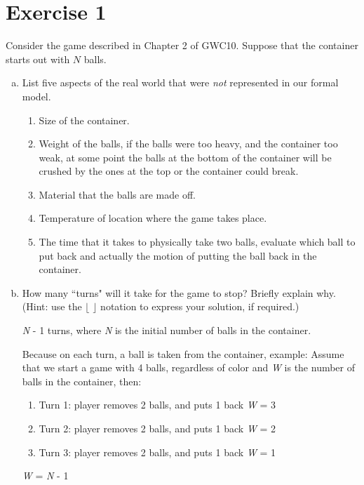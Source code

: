 \documentclass[11pt]{article}
\begin{document}
    \section{
    Exercise 1}
    Consider the game described in Chapter 2 of GWC10. Suppose that
    the container starts out with $N$ balls.
    \begin{enumerate}[(a)]
        \item List five aspects of the real world that were \emph{not}
        represented in our formal model.
        \begin{enumerate}
            \item Size of the container.
            \item Weight of the balls, if the balls were too heavy, and the container too weak, at some point the balls at the bottom of the container will be crushed by the ones at the top or the container could break.
            \item Material that the balls are made off.
            \item Temperature of location where the game takes place.
            \item The time that it takes to physically take two balls, evaluate which ball to put back and actually the motion of putting the ball back in the container.
        \end{enumerate}
        \item How many ``turns" will it take for the game to stop? Briefly explain why. (Hint: use the $\lfloor$ $\rfloor$ notation to express your solution, if required.)

        \textit{N} - 1 turns, where \textit{N} is the initial number of balls in the container.

        Because on each turn, a ball is taken from the container, example:
        Assume that we start a game with 4 balls, regardless of color and \textit{W} is the number of balls in the container, then:
        \begin{enumerate}
            \item Turn 1: player removes 2 balls, and puts 1 back \textit{W} = 3
            \item Turn 2: player removes 2 balls, and puts 1 back \textit{W} = 2
            \item Turn 3: player removes 2 balls, and puts 1 back \textit{W} = 1
        \end{enumerate}

        \textit{W} = \textit{N} - 1


\end{enumerate}
\end{document}

